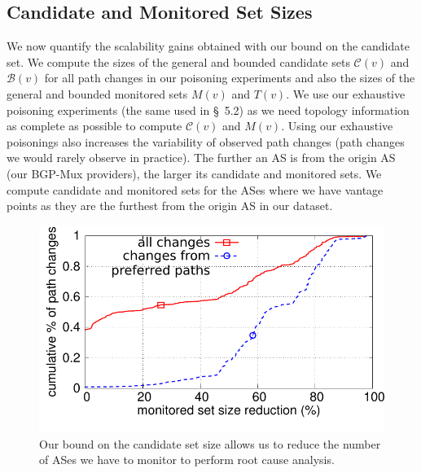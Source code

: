 \subsection{Candidate and Monitored Set Sizes}
\label{subsec:setsizes}

We now quantify the scalability gains obtained with our bound on the
candidate set.  We compute the sizes of the general and bounded
candidate sets $\mathcal{C}(v)$ and $\mathcal{B}(v)$ for all path
changes in our poisoning experiments and also the sizes of the general
and bounded monitored sets $M(v)$ and $T(v)$.  We use our exhaustive
poisoning experiments (the same used in \S~5.2) as we need topology
information as complete as possible to compute $\mathcal{C}(v)$ and
$M(v)$.  Using our exhaustive poisonings also increases the variability
of observed path changes (\ie path changes we would rarely observe in
practice).  The further an AS is from the origin AS (\ie our BGP-Mux
providers), the larger its candidate and monitored sets.  We compute
candidate and monitored sets for the ASes where we have vantage points
as they are the furthest from the origin AS in our dataset.  

\begin{figure}
\begin{center}
\includegraphics[width=1.0\columnwidth]{figs/scalability_monset_gains.pdf}
\caption{Our bound on the candidate set size allows us to reduce the
number of ASes we have to monitor to perform root cause analysis.}
\label{fig:setsizes}
\end{center}
\end{figure}

